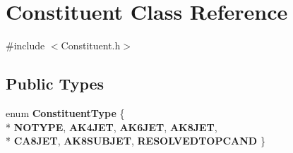 \hypertarget{classConstituent}{\section{Constituent Class Reference}
\label{classConstituent}
}


{\ttfamily \#include $<$Constituent.\-h$>$}

\subsection*{Public Types}
\begin{DoxyCompactItemize}
\item 
enum {\bfseries Constituent\-Type} \{ \\*
{\bfseries N\-O\-T\-Y\-P\-E}, 
{\bfseries A\-K4\-J\-E\-T}, 
{\bfseries A\-K6\-J\-E\-T}, 
{\bfseries A\-K8\-J\-E\-T}, 
\\*
{\bfseries C\-A8\-J\-E\-T}, 
{\bfseries A\-K8\-S\-U\-B\-J\-E\-T}, 
{\bfseries R\-E\-S\-O\-L\-V\-E\-D\-T\-O\-P\-C\-A\-N\-D}
 \}
\end{DoxyCompactItemize}
